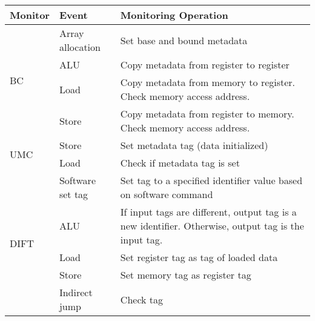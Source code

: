 

\begin{tabular}{|l|l|l|}
\hline

{\bf Monitor} & {\bf Event} & {\bf Monitoring Operation} \\ \hline \hline

\multirow{4}{*}{BC}  
 & Array allocation & Set base and bound metadata \\ \cline{2-3}
 & ALU & Copy metadata from register to register \\  \cline{2-3}
 & Load & Copy metadata from memory to register. Check memory access address. \\ \cline{2-3}
 & Store & Copy metadata from register to memory. Check memory access address. \\ 
\hline\hline

\multirow{2}{*}{UMC}  
 & Store & Set metadata tag (data initialized) \\ \cline{2-3}
 & Load & Check if metadata tag is set \\ 
\hline\hline

\multirow{5}{*}{DIFT}  
 & Software set tag & Set tag to a specified identifier value based on software command \\ \cline{2-3}
 & ALU & If input tags are different, output tag is a new identifier. Otherwise, output tag is the input tag. \\ \cline{2-3}
 & Load & Set register tag as tag of loaded data \\ \cline{2-3}
 & Store & Set memory tag as register tag \\ \cline{2-3}
 & Indirect jump & Check tag \\ 
 \hline


% 

\end{tabular}
